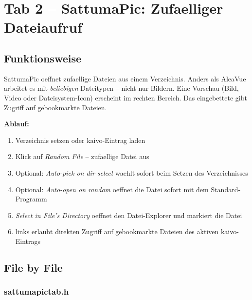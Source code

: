 \chapter{Tab 2 -- SattumaPic: Zufaelliger Dateiaufruf}

\section{Funktionsweise}

SattumaPic oeffnet zufaellige Dateien aus einem Verzeichnis.
Anders als AleaVue arbeitet es mit \emph{beliebigen}
Dateitypen -- nicht nur Bildern.
Eine Vorschau (Bild, Video oder Dateisystem-Icon) erscheint
im rechten Bereich. Das eingebettete 
gibt Zugriff auf gebookmarkte Dateien.

\textbf{Ablauf:}
\begin{enumerate}[noitemsep]
  \item Verzeichnis setzen oder kaivo-Eintrag laden
  \item Klick auf \emph{Random File} -- zufaellige Datei
    aus 
  \item Optional: \emph{Auto-pick on dir select} waehlt
    sofort beim Setzen des Verzeichnisses
  \item Optional: \emph{Auto-open on random} oeffnet
    die Datei sofort mit dem Standard-Programm
  \item \emph{Select in File's Directory} oeffnet den
    Datei-Explorer und markiert die Datei
  \item {} links erlaubt direkten
    Zugriff auf gebookmarkte Dateien des aktiven
    kaivo-Eintrags
\end{enumerate}

\section{File by File}

\subsection{sattumapictab.h}

